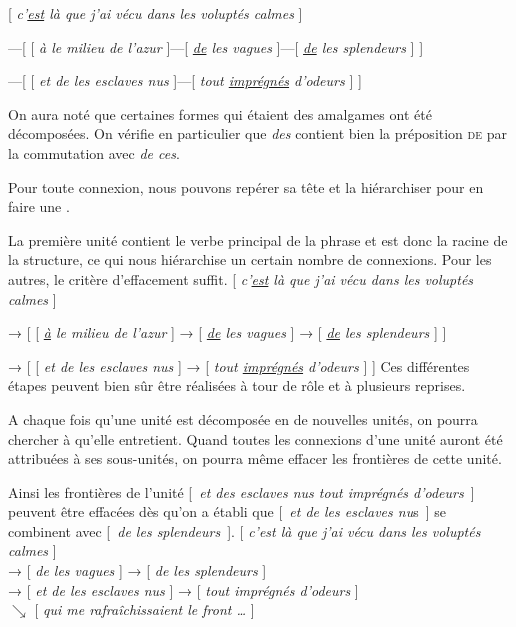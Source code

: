 \ea{}
[ \textit{c’\uline{est} là que j’ai vécu dans les voluptés calmes} ]

—[ [ \textit{à le milieu de l’azur} ]—[ \textit{\uline{de} les vagues} ]—[ \textit{\uline{de} les splendeurs} ] ]

—[ [ \textit{et de les esclaves nus} ]—[ \textit{tout \uline{imprégnés} d’odeurs} ] ]
\z

On aura noté que certaines formes qui étaient des amalgames ont été décomposées. On vérifie en particulier que \textit{des} contient bien la préposition \textsc{de} par la commutation avec \textit{de ces}.

\begin{tblsframed}{}
\noindent Pour toute connexion, nous pouvons repérer sa tête et la hiérarchiser pour en faire une .
\end{tblsframed}

La première unité contient le verbe principal de la phrase et est donc la racine de la structure, ce qui nous hiérarchise un certain nombre de connexions. Pour les autres, le critère d’effacement suffit.
\ea{}
[ \textit{c’\uline{est} là que j’ai vécu dans les voluptés calmes} ]

→ [ [ \textit{\uline{à} le milieu de l’azur} ] → [ \textit{\uline{de} les vagues} ] → [ \textit{\uline{de} les splendeurs} ] ]

→ [ [ \textit{et de les esclaves nus} ] → [ \textit{tout \uline{imprégnés} d’odeurs} ] ]
\z
Ces différentes étapes peuvent bien sûr être réalisées à tour de rôle et à plusieurs reprises.

\begin{tblsframed}{}
\noindent A chaque fois qu’une unité est décomposée en de nouvelles unités, on pourra chercher à  qu’elle entretient. Quand toutes les connexions d’une unité auront été attribuées à ses sous-unités, on pourra même effacer les frontières de cette unité.
\end{tblsframed}

Ainsi les frontières de l’unité [~\textit{et des esclaves nus tout imprégnés d’odeurs}~] peuvent être effacées dès qu’on a établi que [~\textit{et de les esclaves nu}s~] se combinent avec [~\textit{de les splendeurs}~].
\ea{} [ \textit{c’est là que j’ai vécu dans les voluptés calmes} ]\\
\glll{}  {→} {[ \textit{de les vagues} ] → [ \textit{de les splendeurs} ]}\\
            {→ [ \textit{et de les esclaves nus} ]} {→} {[ \textit{tout imprégnés d’odeurs} ]}\\
                          {}                          {$\searrow $} {[ \textit{qui me rafraîchissaient le front …} ]}\\
\z

